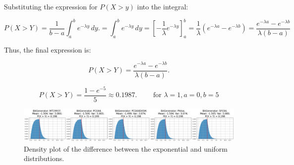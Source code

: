 \documentclass[a4paper,12pt]{article}
\renewenvironment{equation}
{\setlength{\mathindent}{0cm}%
  \begin{equation*}%
  }
  {
\end{equation*}}
\begin{document}
Substituting the expression for \(P(X > y)\) into the integral:

\begin{equation}
  P(X > Y) = \frac{1}{b-a} \int_a^b e^{-\lambda y} \, dy. =
  \int_a^b e^{-\lambda y} \, dy = {\left[ -\frac{1}{\lambda} e^{-\lambda y} \right]}_a^b = \frac{1}{\lambda}\left(e^{-\lambda a} - e^{-\lambda b}\right)
  = \frac{e^{-\lambda a} - e^{-\lambda b}}{\lambda (b-a)}
\end{equation}

Thus, the final expression is:

\begin{equation}
  \boxed{P(X > Y) = \frac{e^{-\lambda a} - e^{-\lambda b}}{\lambda (b-a)}.}
\end{equation}

\begin{equation}
  P(X > Y) = \frac{1 - e^{-5}}{5} \approx 0.1987. \qquad \text{ for } \lambda=1, a=0, b=5
\end{equation}

\begin{figure}[h]
  \centering
  \includegraphics[width=1\textwidth]{ex2-plot.png}
  \caption{Density plot of the difference between the exponential and uniform distributions.}
\end{figure}
\end{document}
